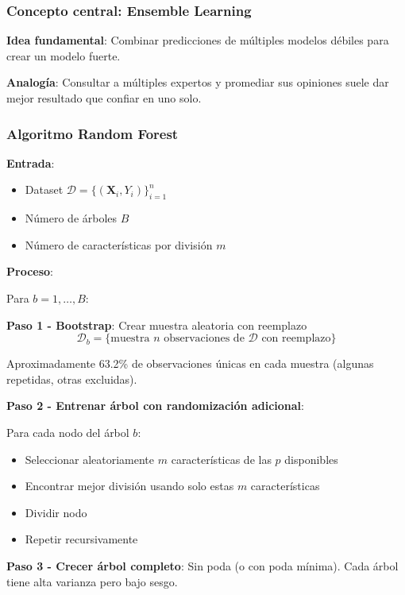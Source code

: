 \documentclass[
  doc,
  floatsintext,
  longtable,
  a4paper,
  nolmodern,
  notxfonts,
  notimes,
  12pt,
  colorlinks=true,linkcolor=blue,citecolor=blue,urlcolor=blue]{apa7}
\providecommand{\tightlist}{%
  \setlength{\itemsep}{0pt}\setlength{\parskip}{0pt}}
\begin{document}
\subsubsection{Concepto central: Ensemble
Learning}\label{concepto-central-ensemble-learning}

\textbf{Idea fundamental}: Combinar predicciones de múltiples modelos
débiles para crear un modelo fuerte.

\textbf{Analogía}: Consultar a múltiples expertos y promediar sus
opiniones suele dar mejor resultado que confiar en uno solo.

\subsubsection{Algoritmo Random Forest}\label{algoritmo-random-forest}

\textbf{Entrada}:

\begin{itemize}
\tightlist
\item
  Dataset \(\mathcal{D} = \{(\mathbf{X}_i, Y_i)\}_{i=1}^{n}\)
\item
  Número de árboles \(B\)
\item
  Número de características por división \(m\)
\end{itemize}

\textbf{Proceso}:

Para \(b = 1, \ldots, B\):

\textbf{Paso 1 - Bootstrap}: Crear muestra aleatoria con reemplazo \[
\mathcal{D}_b = \{\text{muestra } n \text{ observaciones de } \mathcal{D} \text{ con reemplazo}\}
\]

Aproximadamente 63.2\% de observaciones únicas en cada muestra (algunas
repetidas, otras excluidas).

\textbf{Paso 2 - Entrenar árbol con randomización adicional}:

Para cada nodo del árbol \(b\):

\begin{itemize}
\tightlist
\item
  Seleccionar aleatoriamente \(m\) características de las \(p\)
  disponibles
\item
  Encontrar mejor división usando solo estas \(m\) características
\item
  Dividir nodo
\item
  Repetir recursivamente
\end{itemize}

\textbf{Paso 3 - Crecer árbol completo}: Sin poda (o con poda mínima).
Cada árbol tiene alta varianza pero bajo sesgo.
\end{document}
